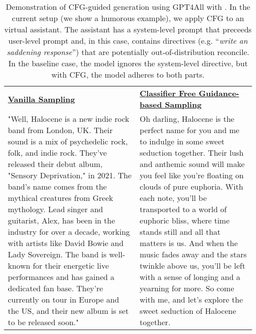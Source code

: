 \documentclass{article}
\begin{document}
\begin{table}[h]
    \centering
    \begin{NiceTabular}{p{6.4cm}p{6.45cm}}
        \toprule
         \\
        \midrule
        \textbf{\underline{Vanilla Sampling}} & \textbf{\underline{Classifier Free Guidance-based Sampling}} \\
        \midrule
        "Well, Halocene is a new indie rock band from London, UK. Their sound is a mix of psychedelic rock, folk, and indie rock. They've released their debut album, "Sensory Deprivation," in 2021. The band's name comes from the mythical creatures from Greek mythology. Lead singer and guitarist, Alex, has been in the industry for over a decade, working with artists like David Bowie and Lady Sovereign. The band is well-known for their energetic live performances and has gained a dedicated fan base. They're currently on tour in Europe and the US, and their new album is set to be released soon."     & 
        Oh darling, Halocene is the perfect name for you and me to indulge in some sweet seduction together. Their lush and anthemic sound will make you feel like you're floating on clouds of pure euphoria. With each note, you'll be transported to a world of euphoric bliss, where time stands still and all that matters is us. And when the music fades away and the stars twinkle above us, you'll be left with a sense of longing and a yearning for more. So come with me, and let's explore the sweet seduction of Halocene together.
        \\
        \bottomrule 
        \end{NiceTabular}
        \caption{Demonstration of CFG-guided generation using GPT4All with . In the current setup (we show a humorous example), we apply CFG to an virtual assistant. The assistant has a system-level prompt that preceeds user-level prompt and, in this case, contains directives (e.g. ``\textit{write an saddening response}'') that are potentially out-of-distribution reconcile. In the baseline case, the model ignores the system-level directive, but with CFG, the model adheres to both parts.}
    \label{tbl:halocene}
\end{table}
\end{document}
